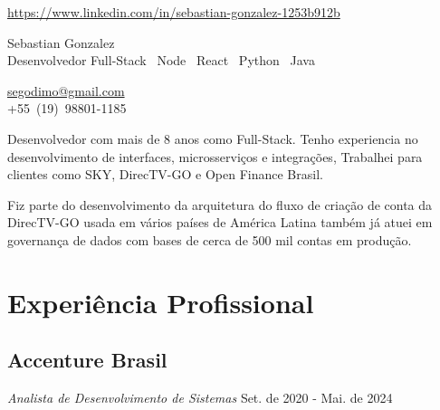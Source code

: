 \documentclass[a4paper,10pt]{article}
\makeatletter
\newcommand{\linkedin}{https://www.linkedin.com/in/sebastian-gonzalez-1253b912b}
\newcommand{\mobile}{+55~(19)~98801-1185}
\newcommand{\email}{segodimo@gmail.com}
\makeatother
\begin{document}
\noindent %


\hfill\textcolor{corSection}{\href{\linkedin}{\linkedin}} 
\begin{minipage}[t]{0.7\textwidth}
  \raggedright %
  \vspace{6mm} %
  \Huge{\textcolor{corHuge}{Sebastian Gonzalez}} \\
  \vspace{2mm} %
  \large{\textcolor{corLarge}{Desenvolvedor Full-Stack}} \textbar\ 
  \large{\textcolor{corLarge}{Node}} \textbar\
  \large{\textcolor{corLarge}{React}} \textbar\
  \large{\textcolor{corLarge}{Python}} \textbar\
  \large{\textcolor{corLarge}{Java}}
\end{minipage}%
\begin{minipage}[t]{0.3\textwidth}
  \raggedleft %
  \setlength{\parskip}{0pt} %
  \textcolor{corSection}{\href{mailto:\email}{\email}} \\
  \textcolor{corSection}{\mobile} 

\end{minipage}

\vspace{5mm}

Desenvolvedor com mais de 8 anos como Full-Stack.
Tenho experiencia no desenvolvimento de interfaces, microsserviços e integrações,
Trabalhei para clientes como SKY, DirecTV-GO
e Open Finance Brasil.

Fiz parte do desenvolvimento da arquitetura do fluxo de criação de conta da DirecTV-GO
usada em vários países de América Latina
também já atuei em governança de dados com bases de cerca de 500 mil contas em produção.

\section*{Experiência Profissional}
\noindent\makebox[\linewidth]{\rule{\linewidth}{0.1mm}\textcolor{corLarge}{}}

\subsection*{Accenture Brasil}
\textcolor{corSubSection}{\emph{Analista de Desenvolvimento de Sistemas}}
\hfill \textcolor{corSubSection}{Set. de 2020 - Mai. de 2024}
\end{document}
